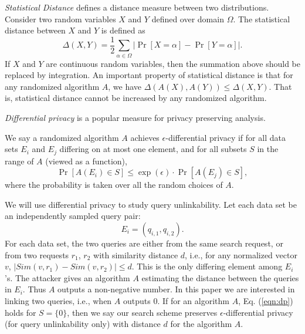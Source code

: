 \documentclass{article}
\begin{document}
\emph{Statistical Distance} \cite{AB09,G95} defines a distance measure between two distributions. Consider two random variables $X$ and $Y$ defined over domain $\Omega$. The statistical distance between $X$ and $Y$ is defined as
$$\Delta(X,Y) = \frac{1}{2}\sum_{\alpha\in\Omega} |\Pr[X=\alpha] - \Pr[Y=\alpha]|.$$
If $X$ and $Y$ are continuous random variables, then the summation above should be replaced by integration.
An important property of statistical distance is that for any randomized algorithm $A$, we have $\Delta(A(X),A(Y))\leq\Delta(X,Y)$. That is, statistical distance cannot be increased by any randomized algorithm.

\emph{Differential privacy} \cite{Dwork08,DR14} is a popular measure for privacy preserving analysis. 
\begin{definition}
We say a randomized algorithm $A$ achieves $\epsilon$-differential privacy if for all data sets $E_i$ and $E_j$ differing on at most one element, and for all subsets $S$ in the range of $A$ (viewed as a function),
\begin{equation}
\label{eqn:dp}
\Pr[A(E_i) \in S] \leq \exp(\epsilon)\cdot \Pr[A(E_j)\in S],
\end{equation}
where the probability is taken over all the random choices of $A$.
\end{definition}
We will use differential privacy to study query unlinkability. Let each data set be an independently sampled query pair: 
$$E_i = (q_{i,1}, q_{i,2}).$$
For each data set, the two queries are either from the same search request, or from two requests $r_1$, $r_2$ with similarity distance $d$, i.e., for any normalized vector $v$, $|Sim(v,r_1) - Sim(v,r_2)| \leq d$. This is the only differing element among $E_i$'s. The attacker gives an algorithm $A$ estimating the distance between the queries in $E_i$. Thus $A$ outputs a non-negative number. In this paper we are interested in linking two queries, i.e., when $A$ outputs 0. If for an algorithm $A$, Eq. (\ref{eqn:dp}) holds for $S=\{0\}$, then we say our search scheme preserves $\epsilon$-differential privacy (for query unlinkability only) with distance $d$ for the algorithm $A$.
\end{document}

